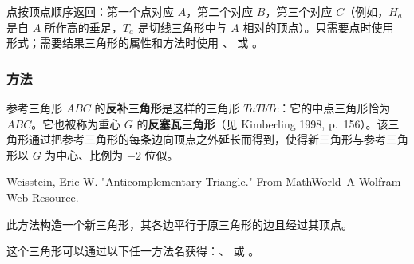 点按顶点顺序返回：第一个点对应 $A$，第二个对应 $B$，第三个对应 $C$（例如，$H_a$ 是自 $A$ 所作高的垂足，$T_a$ 是切线三角形中与 $A$ 相对的顶点）。只需要点时使用  形式；需要结果三角形的属性和方法时使用 、 或 。

\begin{tkzexample}[latex=.45\textwidth]
\begin{center}
\end{center}
\end{tkzexample}

\subsubsection{方法 } %
\label{ssub:method_triangle_anti}

参考三角形 $ABC$ 的\textbf{反补三角形}是这样的三角形 $TaTbTc$：它的中点三角形恰为 $ABC$。它也被称为重心 $G$ 的\textbf{反塞瓦三角形}（见 Kimberling 1998, p.~156）。该三角形通过把参考三角形的每条边向顶点之外延长而得到，使得新三角形与参考三角形以 $G$ 为中心、比例为 $-2$ 位似。\begin{flushright}
  \small
\href{[URL1]}{Weisstein, Eric W. "Anticomplementary Triangle." From MathWorld--A Wolfram Web Resource.}
\end{flushright}

\medskip

此方法构造一个新三角形，其各边平行于原三角形的边且经过其顶点。

\medskip

这个三角形可以通过以下任一方法名获得：、 或 。

\vspace{1em}



